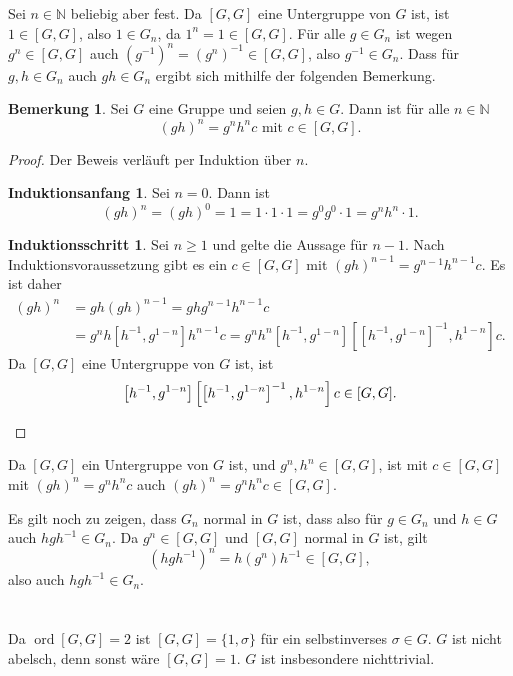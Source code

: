 \documentclass[a4paper,10pt]{article}
\theoremstyle{definition}
\newtheorem{bem}[beh]{Bemerkung}
\newtheorem*{ia}{Induktionsanfang}
\newtheorem*{is}{Induktionsschritt}
\newcommand{\N}{\mathbb{N}}
\newcommand{\ord}{\operatorname{ord}}
\begin{document}
\section{}
Sei $n \in \N$ beliebig aber fest. Da $[G,G]$ eine Untergruppe von $G$ ist, ist $1 \in [G,G]$, also $1 \in G_n$, da $1^n = 1 \in [G,G]$. Für alle $g \in G_n$ ist wegen $g^n \in [G,G]$ auch $(g^{-1})^n = (g^n)^{-1} \in [G,G]$, also $g^{-1} \in G_n$. Dass für $g,h \in G_n$ auch $gh \in G_n$ ergibt sich mithilfe der folgenden Bemerkung.

\begin{bem}
 Sei $G$ eine Gruppe und seien $g,h \in G$. Dann ist für alle $n \in \N$
 \[
  (gh)^n = g^n h^n c \text{ mit } c \in [G,G].
 \]
\end{bem}
\begin{proof}
 Der Beweis verläuft per Induktion über $n$.
 \begin{ia}
  Sei $n=0$. Dann ist
  \[
   (gh)^n = (gh)^0 = 1 = 1 \cdot 1 \cdot 1 = g^0 g^0 \cdot 1 = g^n h^n \cdot 1.
  \]
 \end{ia}
 \begin{is}
  Sei $n \geq 1$ und gelte die Aussage für $n-1$. Nach Induktionsvoraussetzung gibt es ein $c \in [G,G]$ mit $(gh)^{n-1} = g^{n-1} h^{n-1} c$. Es ist daher
  \begin{align*}
   (gh)^n
   &= gh (gh)^{n-1}
   = gh g^{n-1} h^{n-1} c \\
   &= g^n h \left[h^{-1},g^{1-n}\right] h^{n-1} c
   = g^n h^n \left[h^{-1},g^{1-n}\right] \left[\left[h^{-1},g^{1-n}\right]^{-1}, h^{1-n}\right] c.
  \end{align*}
  Da $[G,G]$ eine Untergruppe von $G$ ist, ist
  \[
   \left[h^{-1},g^{1-n}\right] \left[\left[h^{-1},g^{1-n}\right]^{-1}, h^{1-n}\right] c \in [G,G]. \qedhere
  \]
 \end{is}
\end{proof}

Da $[G,G]$ ein Untergruppe von $G$ ist, und $g^n, h^n \in [G,G]$, ist mit $c \in [G,G]$ mit $(gh)^n = g^n h^n c$ auch $(gh)^n = g^n h^n c \in [G,G]$.

Es gilt noch zu zeigen, dass $G_n$ normal in $G$ ist, dass also für $g \in G_n$ und $h \in G$ auch $hgh^{-1} \in G_n$. Da $g^n \in [G,G]$ und $[G,G]$ normal in $G$ ist, gilt
\[
 (hgh^{-1})^n = h(g^n)h^{-1} \in [G,G],
\]
also auch $hgh^{-1} \in G_n$.







\section{}
Da $\ord [G,G] = 2$ ist $[G,G] = \{1, \sigma\}$ für ein selbstinverses $\sigma \in G$. $G$ ist nicht abelsch, denn sonst wäre $[G,G] = 1$. $G$ ist insbesondere nichttrivial.
\end{document}
